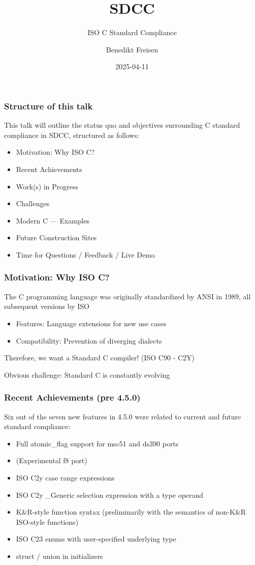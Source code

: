 \documentclass[xcolor=dvipsnames]{beamer}
\title{SDCC}
\subtitle{ISO C Standard Compliance}
\date{2025-04-11}
\author{Benedikt Freisen}
\begin{document}
\begin{frame}
	\titlepage
\end{frame}

\begin{frame}
	\frametitle{Structure of this talk}
	This talk will outline the status quo and objectives surrounding C standard compliance in SDCC, structured as follows:
	\begin{itemize}
		\item Motivation: Why ISO C?
		\item Recent Achievements
		\item Work(s) in Progress
        \item Challenges
        \item Modern C --- Examples
        \item Future Construction Sites
        \item Time for Questions / Feedback / Live Demo
	\end{itemize}
	
\end{frame}

\begin{frame}
	\frametitle{Motivation: Why ISO C?}
	The C programming language was originally standardized by ANSI in 1989, all subsequent versions by ISO
	\begin{itemize}
		\item Features: Language extensions for new use cases
		\item Compatibility: Prevention of diverging dialects
	\end{itemize}
	Therefore, we want a Standard C compiler! (ISO C90 - C2Y)

	Obvious challenge: Standard C is constantly evolving
\end{frame}

\begin{frame}
	\frametitle{Recent Achievements (pre 4.5.0)}
	Six out of the seven new features in 4.5.0 were related to current and future standard compliance:
	\begin{itemize}
		\item Full atomic\_flag support for msc51 and ds390 ports
		\item (Experimental f8 port)
		\item ISO C2y case range expressions
		\item ISO C2y \_Generic selection expression with a type operand
		\item K\&R-style function syntax (preliminarily with the semantics of non-K\&R ISO-style functions)
		\item ISO C23 enums with user-specified underlying type
		\item struct / union in initializers
	\end{itemize}
\end{frame}
\end{document}
